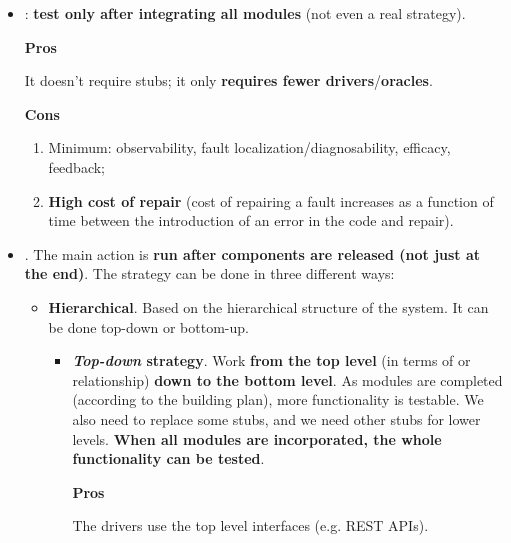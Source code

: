 \begin{itemize}
    \item {}: \textbf{test only after integrating all modules} (not even a real strategy). 
    
    \begin{flushleft}
        \textcolor{Green3}{ \textbf{Pros}}
    \end{flushleft}
    It doesn't require stubs; it only \textbf{requires fewer drivers}/\textbf{oracles}.
    
    \begin{flushleft}
        \textcolor{Red2}{ \textbf{Cons}}
    \end{flushleft}
    \begin{enumerate}
        \item Minimum: observability, fault localization/diagnosability, efficacy, feedback;
        \item \textbf{High cost of repair} (cost of repairing a fault increases as a function of time between the introduction of an error in the code and repair).
    \end{enumerate}

    \newpage


    \item {}. The main action is \textbf{run after components are released (not just at the end)}. The strategy can be done in three different ways:
    \begin{itemize}
        \item \textbf{Hierarchical}. Based on the hierarchical structure of the system. It can be done top-down or bottom-up.
        \begin{itemize}
            \item \textbf{\emph{Top-down} strategy}. Work \textbf{from the top level} (in terms of  or  relationship) \textbf{down to the bottom level}. As modules are completed (according to the building plan), more functionality is testable. We also need to replace some stubs, and we need other stubs for lower levels. \textbf{When all modules are incorporated, the whole functionality can be tested}.
            
            \highspace
            \begin{flushleft}
                \textcolor{Green3}{ \textbf{Pros}}
            \end{flushleft}
            The drivers use the top level interfaces (e.g. REST APIs).
            

\end{itemize}
\end{itemize}
\end{itemize}
